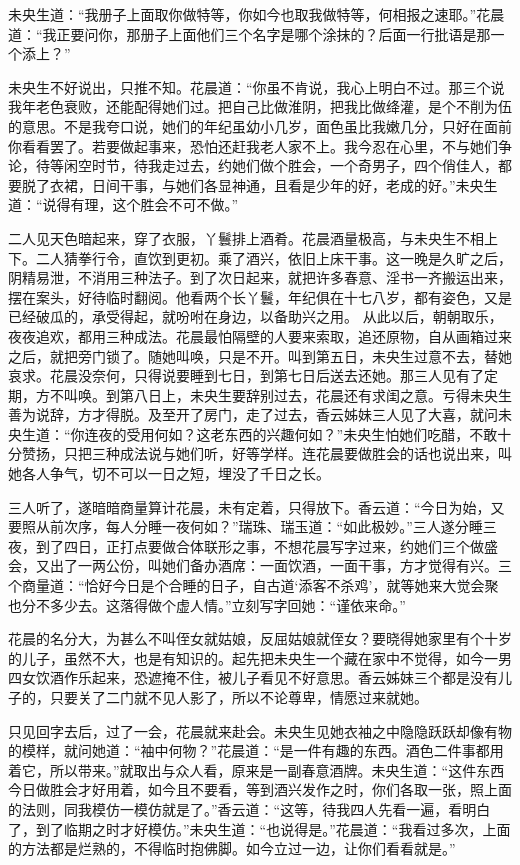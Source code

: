 \documentclass[a4paper,12pt,UTF8,twoside]{ctexbook}
\begin{document}
未央生道：“我册子上面取你做特等，你如今也取我做特等，何相报之速耶。”花晨道：“我正要问你，那册子上面他们三个名字是哪个涂抹的？后面一行批语是那一个添上？”

未央生不好说出，只推不知。花晨道：“你虽不肯说，我心上明白不过。那三个说我年老色衰败，还能配得她们过。把自己比做淮阴，把我比做绛灌，是个不削为伍的意思。不是我夸口说，她们的年纪虽幼小几岁，面色虽比我嫩几分，只好在面前你看看罢了。若要做起事来，恐怕还赶我老人家不上。我今忍在心里，不与她们争论，待等闲空时节，待我走过去，约她们做个胜会，一个奇男子，四个俏佳人，都要脱了衣裙，日间干事，与她们各显神通，且看是少年的好，老成的好。”未央生道：“说得有理，这个胜会不可不做。”

二人见天色暗起来，穿了衣服，丫鬟排上酒肴。花晨酒量极高，与未央生不相上下。二人猜拳行令，直饮到更初。乘了酒兴，依旧上床干事。这一晚是久旷之后，阴精易泄，不消用三种法子。到了次日起来，就把许多春意、淫书一齐搬运出来，摆在案头，好待临时翻阅。他看两个长丫鬟，年纪俱在十七八岁，都有姿色，又是已经破瓜的，承受得起，就吩咐在身边，以备助兴之用。 从此以后，朝朝取乐，夜夜追欢，都用三种成法。花晨最怕隔壁的人要来索取，追还原物，自从画箱过来之后，就把旁门锁了。随她叫唤，只是不开。叫到第五日，未央生过意不去，替她哀求。花晨没奈何，只得说要睡到七日，到第七日后送去还她。那三人见有了定期，方不叫唤。到第八日上，未央生要辞别过去，花晨还有求闺之意。亏得未央生善为说辞，方才得脱。及至开了房门，走了过去，香云姊妹三人见了大喜，就问未央生道：“你连夜的受用何如？这老东西的兴趣何如？”未央生怕她们吃醋，不敢十分赞扬，只把三种成法说与她们听，好等学样。连花晨要做胜会的话也说出来，叫她各人争气，切不可以一日之短，埋没了千日之长。

三人听了，遂暗暗商量算计花晨，未有定着，只得放下。香云道：“今日为始，又要照从前次序，每人分睡一夜何如？”瑞珠、瑞玉道：“如此极妙。”三人遂分睡三夜，到了四日，正打点要做合体联形之事，不想花晨写字过来，约她们三个做盛会，又出了一两公份，叫她们备办酒席：一面饮酒，一面干事，方才觉得有兴。三个商量道：“恰好今日是个合睡的日子，自古道‘添客不杀鸡’，就等她来大觉会聚也分不多少去。这落得做个虚人情。”立刻写字回她：“谨依来命。”

花晨的名分大，为甚么不叫侄女就姑娘，反屈姑娘就侄女？要晓得她家里有个十岁的儿子，虽然不大，也是有知识的。起先把未央生一个藏在家中不觉得，如今一男四女饮酒作乐起来，恐遮掩不住，被儿子看见不好意思。香云姊妹三个都是没有儿子的，只要关了二门就不见人影了，所以不论尊卑，情愿过来就她。

只见回字去后，过了一会，花晨就来赴会。未央生见她衣袖之中隐隐跃跃却像有物的模样，就问她道：“袖中何物？”花晨道：“是一件有趣的东西。酒色二件事都用着它，所以带来。”就取出与众人看，原来是一副春意酒牌。未央生道：“这件东西今日做胜会才好用着，如今且不要看，等到酒兴发作之时，你们各取一张，照上面的法则，同我模仿一模仿就是了。”香云道：“这等，待我四人先看一遍，看明白了，到了临期之时才好模仿。”未央生道：“也说得是。”花晨道：“我看过多次，上面的方法都是烂熟的，不得临时抱佛脚。如今立过一边，让你们看看就是。”
\end{document}
